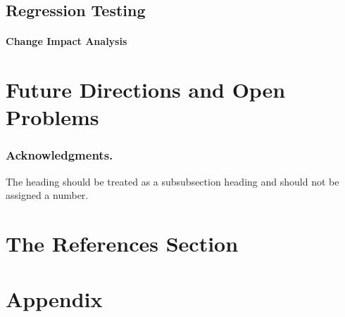 \documentclass[runningheads,a4paper]{llncs}
\begin{document}
\subsection{Regression Testing} 
\paragraph{Change Impact Analysis} 

\section{Future Directions and Open Problems} 


\subsubsection*{Acknowledgments.} The heading should be treated as a
subsubsection heading and should not be assigned a number.

\section{The References Section}\label{references}



\section*{Appendix} 
\end{document}
